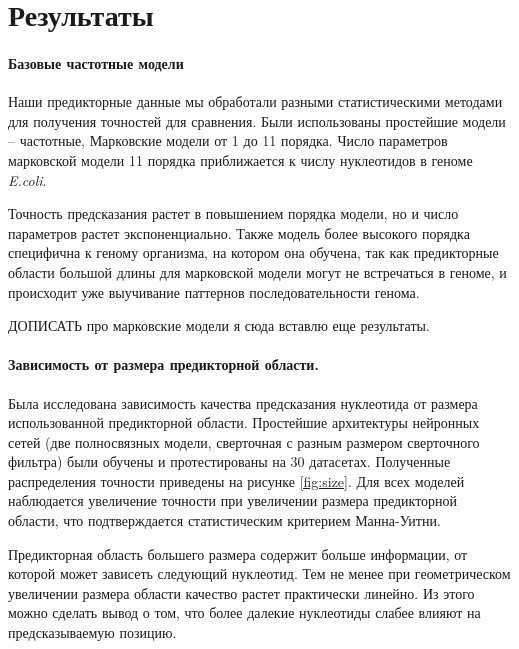 \section{Результаты}
\newcommand{\mannwhitni}{{\scriptsize Значимость отличия выборок по критерию Манна-Уитни: ns $P>0.05$, * $P\leq 0.05$, ** $P\leq 0.01$, *** $P\leq 0.001$}}

\paragraph{Базовые частотные модели} Наши предикторные данные мы обработали разными статистическими методами для получения точностей для сравнения. Были использованы простейшие модели -- частотные, Марковские модели от 1 до 11 порядка. Число параметров марковской модели 11 порядка приближается к числу нуклеотидов в геноме \emph{E.coli}.

Точность предсказания растет в повышением порядка модели, но и число параметров растет экспоненциально. Также модель более высокого порядка специфична к геному организма, на котором она обучена, так как предикторные области большой длины для марковской модели могут не встречаться в геноме, и происходит уже выучивание паттернов последовательности генома.

ДОПИСАТЬ про марковские модели я сюда вставлю еще результаты.



\paragraph{Зависимость от размера предикторной области.} Была исследована зависимость качества предсказания нуклеотида от размера использованной предикторной области. Простейшие архитектуры нейронных сетей (две полносвязных модели, сверточная с разным размером сверточного фильтра) были обучены и протестированы на 30 датасетах. Полученные распределения точности приведены на рисунке \ref{fig:size}. Для всех моделей наблюдается увеличение точности при увеличении размера предикторной области, что подтверждается статистическим критерием Манна-Уитни.

Предикторная область большего размера содержит больше информации, от которой может зависеть следующий нуклеотид. Тем не менее при геометрическом увеличении размера области качество растет практически линейно. Из этого можно сделать вывод о том, что более далекие нуклеотиды слабее влияют на предсказываемую позицию.



